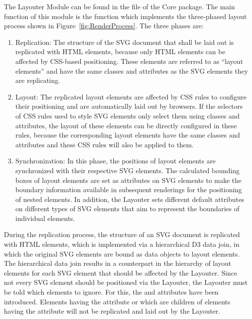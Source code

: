 The Layouter Module can be found in the  file of the
Core package. The main function of this module is the
 function which implements the three-phased
layout process shown in Figure~\ref{fig:RenderProcess}. The three
phases are:
\begin{enumerate}
\item Replication: The structure of the SVG document that shall be
  laid out is replicated with HTML  elements, because
  only HTML elements can be affected by CSS-based positioning. These
  elements are referred to as \enquote{layout elements} and have the
  same classes and  attributes as the SVG elements
  they are replicating.

\item Layout: The replicated layout elements are affected by CSS rules
  to configure their positioning and are automatically laid out by
  browsers. If the selectors of CSS rules used to style SVG elements
  only select them using classes and  attributes, the
  layout of these elements can be directly configured in these rules,
  because the corresponding layout elements have the same classes and
   attributes and these CSS rules will also be
  applied to them.

\item Synchronization: In this phase, the positions of layout elements
  are synchronized with their respective SVG elements. The calculated
  bounding boxes of layout elements are set as 
  attributes on SVG elements to make the boundary information
  available in subsequent renderings for the positioning of nested
  elements. In addition, the Layouter sets different default
  attributes on different types of SVG elements that aim to represent
  the boundaries of individual elements.
\end{enumerate}


During the replication process, the structure of an SVG document is
replicated with HTML  elements, which is implemented via
a hierarchical D3 data join, in which the original SVG elements are
bound as data objects to layout elements. The hierarchical data join
results in a counterpart in the hierarchy of layout elements for each
SVG element that should be affected by the Layouter. Since
not every SVG element should be positioned via the Layouter,
the Layouter must be told which elements to ignore. For
this, the  and
 attributes have been
introduced. Elements having the 
attribute or which are children of elements having the
 attribute will not be
replicated and laid out by the Layouter.

